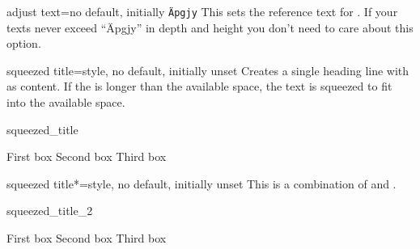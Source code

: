 \begin{docTcbKey}{adjust text}{=}{no default, initially \texttt{\"Apgjy}}
  This sets the reference text for . If your texts
  never exceed \enquote{\"Apgjy} in depth and height you don't need to care about this option.
\end{docTcbKey}

\clearpage

\begin{docTcbKey}[][doc new=2014-11-24]{squeezed title}{=}{style, no default, initially unset}
  Creates a single heading line with  as content.
  If the  is longer than the available space, the text is
  squeezed to fit into the available space.
\begin{exdispExample}{squeezed_title}
\begin{tcbitemize}[raster columns=3,raster equal height,
  colframe=red!75!black,colback=red!5!white,fonttitle=\bfseries]
\tcbitem[squeezed title={Short title}]
  First box
\tcbitem[squeezed title={This is a very very long title}]
  Second box
\tcbitem[squeezed title={This title is clearly to long for this application}]
  Third box
\end{tcbitemize}
\end{exdispExample}
\end{docTcbKey}

\begin{docTcbKey}[][doc new=2014-11-24]{squeezed title*}{=}{style, no default, initially unset}
  This is a combination of  and  .
\begin{exdispExample}{squeezed_title_2}
\begin{tcbitemize}[raster columns=3,raster equal height,
  colframe=red!75!black,colback=red!5!white,fonttitle=\bfseries]
\tcbitem[squeezed title*={Short title}]
  First box
\tcbitem[squeezed title*={This is a very very long title}]
  Second box
\tcbitem[squeezed title*={This title is clearly to long for this application}]
  Third box
\end{tcbitemize}
\end{exdispExample}
\end{docTcbKey}


